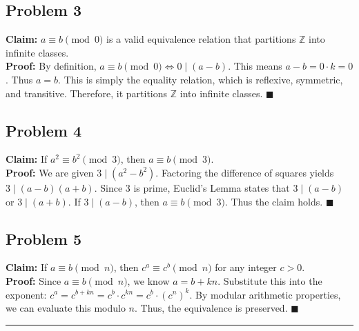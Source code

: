 \documentclass[11pt, a4paper]{article}
\theoremstyle{definition}
\theoremstyle{remark}
\begin{document}
\subsection*{Problem 3}
\textbf{Claim:} $a \equiv b \pmod{0}$ is a valid equivalence relation that partitions $\mathbb{Z}$ into infinite classes. \\
\textbf{Proof:} By definition, $a \equiv b \pmod{0} \iff 0 \mid (a - b)$. This means $a - b = 0 \cdot k = 0$. Thus $a = b$. This is simply the equality relation, which is reflexive, symmetric, and transitive. Therefore, it partitions $\mathbb{Z}$ into infinite classes. $\blacksquare$

\subsection*{Problem 4}
\textbf{Claim:} If $a^2 \equiv b^2 \pmod{3}$, then $a \equiv b \pmod{3}$. \\
\textbf{Proof:} We are given $3 \mid (a^2 - b^2)$. Factoring the difference of squares yields $3 \mid (a - b)(a + b)$. Since 3 is prime, Euclid's Lemma states that $3 \mid (a - b)$ or $3 \mid (a + b)$. If $3 \mid (a - b)$, then $a \equiv b \pmod{3}$. Thus the claim holds. $\blacksquare$

\subsection*{Problem 5}
\textbf{Claim:} If $a \equiv b \pmod{n}$, then $c^a \equiv c^b \pmod{n}$ for any integer $c > 0$. \\
\textbf{Proof:} Since $a \equiv b \pmod{n}$, we know $a = b + kn$. Substitute this into the exponent: $c^a = c^{b + kn} = c^b \cdot c^{kn} = c^b \cdot (c^n)^k$. By modular arithmetic properties, we can evaluate this modulo $n$. Thus, the equivalence is preserved. $\blacksquare$

\vspace{1cm}
\hrule
\vspace{0.5cm}
\end{document}

